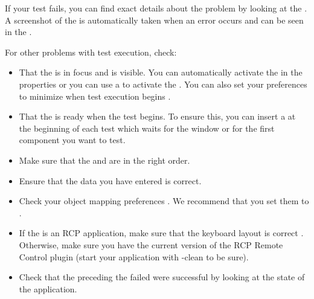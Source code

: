 

If your test fails, you can find exact details about the problem by looking at the \gdtestresultview{} . A screenshot of the \gdaut{} is automatically taken when an error occurs and can be seen in the \gdimgview{}.

For other problems with test execution, check:

\begin{itemize}
\item That the \gdaut{} is in focus and is visible. You can automatically activate the \gdaut{} in the \gdaut{} properties  or you can use a \gdcase{} to activate the \gdaut{}. You can also set your preferences to minimize \app{} when test execution begins . 
\item That the \gdaut{} is ready when the test begins. To ensure this, you can insert a \gdcase{} at the beginning of each test which waits for the window or for the first component you want to test. 

\item Make sure that the \gdcases{} and \gdsteps{} are in the right order.
\item Ensure that the data you have entered is correct.
\item Check your object mapping preferences . We recommend that you set them to .
\item If the \gdaut{} is an RCP application, make sure that the keyboard layout is correct . Otherwise, make sure you have the current version of the RCP Remote Control plugin (start your application with -clean to be sure).  
\item Check that the \gdsteps{} preceding the failed \gdstep{} were successful by looking at the state of the application.  
\end{itemize}
